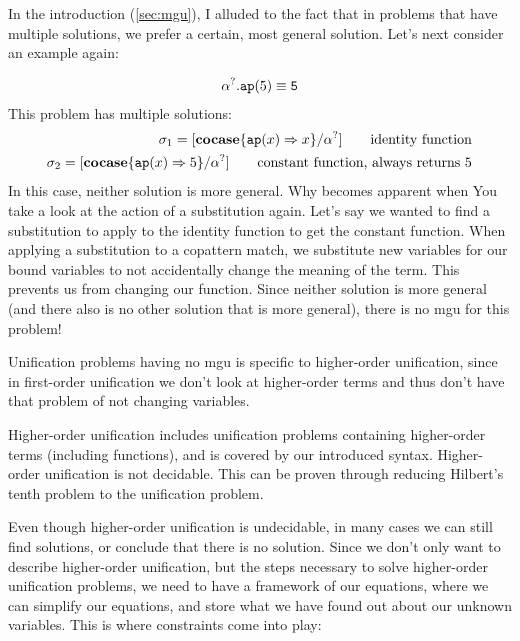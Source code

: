 \documentclass[twoside,12pt,a4paper]{article}
\begin{document}
In the introduction (\ref{sec:mgu}), I alluded to the fact that in problems that have multiple solutions, we prefer a certain, most general solution.
Let's next consider an example again:
\begin{example}
    \begin{align*}
        \alpha^?.\texttt{ap}(5) \equiv \texttt{5}
    \end{align*}
    This problem has multiple solutions:
    \begin{align*}
        \sigma_1 = [\textbf{cocase}\{\texttt{ap}(x)\Rightarrow x\} / \alpha^?]\tag*{identity function}\\
        \sigma_2 = [\textbf{cocase}\{\texttt{ap}(x)\Rightarrow 5\} / \alpha^?]\tag*{constant function, always returns 5}
    \end{align*}
    In this case, neither solution is more general. Why becomes apparent when You take a look at the action of a substitution again. 
Let's say we wanted to find a substitution to apply to the identity function to get the constant function. 
When applying a substitution to a copattern match, we substitute new variables for our bound variables to not accidentally change the meaning of the term.
This prevents us from changing our function. 
Since neither solution is more general (and there also is no other solution that is more general),
there is no mgu for this problem!
\end{example}

Unification problems having no mgu is specific to higher-order unification, since in first-order unification we don't look at 
higher-order terms and thus don't have that problem of not changing variables.

\begin{theorem}
    Higher-order unification includes unification problems containing higher-order terms (including functions),
    and is covered by our introduced syntax. %
    Higher-order unification is not decidable. This can be proven through reducing Hilbert's tenth problem to the unification problem.%
\end{theorem}

Even though higher-order unification is undecidable, in many cases we can still find solutions,
or conclude that there is no solution.
Since we don't only want to describe higher-order unification, but the steps necessary to solve higher-order unification problems,
we need to have a framework of our equations, where we can simplify our equations,
and store what we have found out about our unknown variables. This is where constraints come into play:
\end{document}
